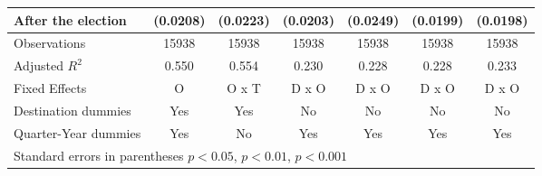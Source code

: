 \begin{table}[!ht]
\begin{tabular}{l*{6}{c}}
 After the election                    &    (0.0208)         &    (0.0223)         &    (0.0203)         &    (0.0249)         &    (0.0199)         &    (0.0198)         \\
\hline
Observations        &       15938         &       15938         &       15938         &       15938         &       15938         &       15938         \\
Adjusted \(R^{2}\)  &       0.550         &       0.554         &       0.230         &       0.228         &       0.228         &       0.233         \\
Fixed Effects       &           O         &       O x T         &       D x O         &       D x O         &       D x O         &       D x O         \\
Destination dummies &         Yes         &         Yes         &          No         &          No         &          No         &          No         \\
Quarter-Year dummies&         Yes         &          No         &         Yes         &         Yes         &         Yes         &         Yes         \\
\hline\hline
\multicolumn{7}{l}{Standard errors in parentheses \sym{*} \(p<0.05\), \sym{**} \(p<0.01\), \sym{***} \(p<0.001\)}\\
\end{tabular}
\end{table}
